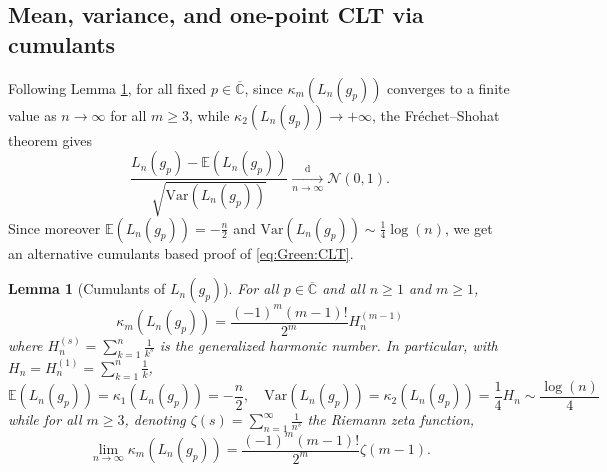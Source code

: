 \documentclass[10pt,reqno]{amsart}
\numberwithin{equation}{section}
\numberwithin{figure}{section}
\theoremstyle{plain}
\newtheorem{lemma}[theorem]{Lemma}
\newcommand{\<}{\langle}
\renewcommand{\>}{\rangle}
\begin{document}
\subsection{Mean, variance, and one-point CLT via cumulants}
\label{ss:meanvarcum}

Following Lemma \ref{le:Green:cum}, for all fixed $p\in\overline{\mathbb{C}}$, since $\kappa_m(L_n(g_p))$ converges to a finite value as $n\to\infty$ for all $m\geq3$, while $\kappa_2(L_n(g_p))\to+\infty$, the Fréchet--Shohat theorem gives 
\begin{equation}
    \frac{L_n(g_p)-\mathbb{E}(L_n(g_p))}{\sqrt{\mathrm{Var}(L_n(g_p))}}\xrightarrow[n\to\infty]{\mathrm{d}}\mathcal{N}(0,1).
\end{equation}
Since moreover $\mathbb{E}(L_n(g_p))=-\frac{n}{2}$ and $\mathrm{Var}(L_n(g_p))\sim\frac{1}{4}\log(n)$, we get an alternative cumulants based proof of \eqref{eq:Green:CLT}.

\begin{lemma}[Cumulants of $L_n(g_p)$]\label{le:Green:cum}
  For all $p\in\overline{\mathbb{C}}$ and all $n\geq1$ and $m\geq1$,
  \begin{equation}\label{eq:Lngp:cum}
    \kappa_m(L_n(g_p)) = \frac{(-1)^m (m-1)!}{2^m}H_{n}^{(m-1)}    
  \end{equation}
  where $H^{(s)}_n=\sum_{k=1}^n\frac{1}{k^s}$ is the generalized harmonic number. In particular, with $H_n=H_n^{(1)}=\sum_{k=1}^n\frac{1}{k}$,
  \begin{equation}\label{eq:Green:mean:var}
    \mathbb{E}(L_n(g_p))=\kappa_1(L_n(g_p))=-\frac{n}{2},
    \quad \mathrm{Var}(L_n(g_p))=\kappa_2(L_n(g_p))=\frac{1}{4}H_n\sim\frac{\log(n)}{4}
   \end{equation}
   while for all $m\geq3$, denoting $\zeta(s)=\sum_{n=1}^\infty\frac{1}{n^s}$ the Riemann zeta function,
   \begin{equation}
    \lim_{n\to\infty}\kappa_m(L_n(g_p)) = \frac{(-1)^m (m-1)!}{2^m}\zeta(m-1).
  \end{equation}
\end{lemma}
\end{document}
